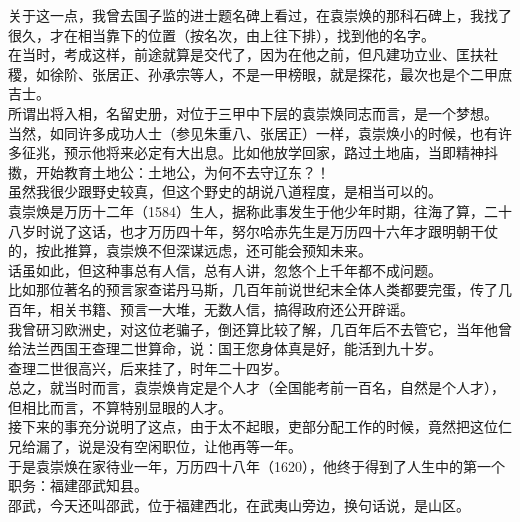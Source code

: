 \begin{multicols}{\theparacolNo}
关于这一点，我曾去国子监的进士题名碑上看过，在袁崇焕的那科石碑上，我找了很久，才在相当靠下的位置（按名次，由上往下排），找到他的名字。\\

在当时，考成这样，前途就算是交代了，因为在他之前，但凡建功立业、匡扶社稷，如徐阶、张居正、孙承宗等人，不是一甲榜眼，就是探花，最次也是个二甲庶吉士。\\

所谓出将入相，名留史册，对位于三甲中下层的袁崇焕同志而言，是一个梦想。\\

当然，如同许多成功人士（参见朱重八、张居正）一样，袁崇焕小的时候，也有许多征兆，预示他将来必定有大出息。比如他放学回家，路过土地庙，当即精神抖擞，开始教育土地公：土地公，为何不去守辽东？！\\

虽然我很少跟野史较真，但这个野史的胡说八道程度，是相当可以的。\\

袁崇焕是万历十二年（1584）生人，据称此事发生于他少年时期，往海了算，二十八岁时说了这话，也才万历四十年，努尔哈赤先生是万历四十六年才跟明朝干仗的，按此推算，袁崇焕不但深谋远虑，还可能会预知未来。\\

话虽如此，但这种事总有人信，总有人讲，忽悠个上千年都不成问题。\\

比如那位著名的预言家查诺丹马斯，几百年前说世纪末全体人类都要完蛋，传了几百年，相关书籍、预言一大堆，无数人信，搞得政府还公开辟谣。\\

我曾研习欧洲史，对这位老骗子，倒还算比较了解，几百年后不去管它，当年他曾给法兰西国王查理二世算命，说：国王您身体真是好，能活到九十岁。\\

查理二世很高兴，后来挂了，时年二十四岁。\\

总之，就当时而言，袁崇焕肯定是个人才（全国能考前一百名，自然是个人才），但相比而言，不算特别显眼的人才。\\

接下来的事充分说明了这点，由于太不起眼，吏部分配工作的时候，竟然把这位仁兄给漏了，说是没有空闲职位，让他再等一年。\\

于是袁崇焕在家待业一年，万历四十八年（1620），他终于得到了人生中的第一个职务：福建邵武知县。\\

邵武，今天还叫邵武，位于福建西北，在武夷山旁边，换句话说，是山区。\\


\end{multicols}
